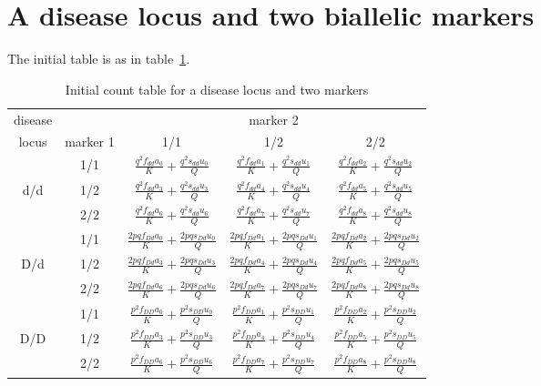 \section*{A disease locus and two biallelic markers}

The initial table is as in table~\ref{initthreethree}.

\begin{table}[h]
\centering
\caption{Initial count table for a disease locus and two markers\label{initthreethree}}
\vskip 0.3cm
\begin{tabular}{ccccc}
\hline
disease&&\multicolumn{3}{c}{marker 2}\\ \cline{3-5}
locus& marker 1& 1/1 & 1/2 & 2/2 \\
\hline
   & 1/1 &$ \frac{  q^2f_{dd}a_{0}}{K} + \frac{  q^2s_{dd}u_{0}}{Q} $ &
          $ \frac{  q^2f_{dd}a_{1}}{K} + \frac{  q^2s_{dd}u_{1}}{Q} $ &
          $ \frac{  q^2f_{dd}a_{2}}{K} + \frac{  q^2s_{dd}u_{2}}{Q} $ \\
d/d& 1/2 &$ \frac{  q^2f_{dd}a_{3}}{K} + \frac{  q^2s_{dd}u_{3}}{Q} $ &
          $ \frac{  q^2f_{dd}a_{4}}{K} + \frac{  q^2s_{dd}u_{4}}{Q} $ &
          $ \frac{  q^2f_{dd}a_{5}}{K} + \frac{  q^2s_{dd}u_{5}}{Q} $ \\
   & 2/2 &$ \frac{  q^2f_{dd}a_{6}}{K} + \frac{  q^2s_{dd}u_{6}}{Q} $ &
          $ \frac{  q^2f_{dd}a_{7}}{K} + \frac{  q^2s_{dd}u_{7}}{Q} $ &
          $ \frac{  q^2f_{dd}a_{8}}{K} + \frac{  q^2s_{dd}u_{8}}{Q} $ \\
   & 1/1 &$ \frac{2 p qf_{Dd}a_{0}}{K} + \frac{2 p qs_{Dd}u_{0}}{Q} $ &
          $ \frac{2 p qf_{Dd}a_{1}}{K} + \frac{2 p qs_{Dd}u_{1}}{Q} $ &
          $ \frac{2 p qf_{Dd}a_{2}}{K} + \frac{2 p qs_{Dd}u_{2}}{Q} $ \\
D/d& 1/2 &$ \frac{2 p qf_{Dd}a_{3}}{K} + \frac{2 p qs_{Dd}u_{3}}{Q} $ &
          $ \frac{2 p qf_{Dd}a_{4}}{K} + \frac{2 p qs_{Dd}u_{4}}{Q} $ &
          $ \frac{2 p qf_{Dd}a_{5}}{K} + \frac{2 p qs_{Dd}u_{5}}{Q} $ \\
   & 2/2 &$ \frac{2 p qf_{Dd}a_{6}}{K} + \frac{2 p qs_{Dd}u_{6}}{Q} $ &
          $ \frac{2 p qf_{Dd}a_{7}}{K} + \frac{2 p qs_{Dd}u_{7}}{Q} $ &
          $ \frac{2 p qf_{Dd}a_{8}}{K} + \frac{2 p qs_{Dd}u_{8}}{Q} $ \\
   & 1/1 &$ \frac{  p^2f_{DD}a_{0}}{K} + \frac{  p^2s_{DD}u_{0}}{Q} $ &
          $ \frac{  p^2f_{DD}a_{1}}{K} + \frac{  p^2s_{DD}u_{1}}{Q} $ &
          $ \frac{  p^2f_{DD}a_{2}}{K} + \frac{  p^2s_{DD}u_{2}}{Q} $ \\
D/D& 1/2 &$ \frac{  p^2f_{DD}a_{3}}{K} + \frac{  p^2s_{DD}u_{3}}{Q} $ &
          $ \frac{  p^2f_{DD}a_{4}}{K} + \frac{  p^2s_{DD}u_{4}}{Q} $ &
          $ \frac{  p^2f_{DD}a_{5}}{K} + \frac{  p^2s_{DD}u_{5}}{Q} $ \\
   & 2/2 &$ \frac{  p^2f_{DD}a_{6}}{K} + \frac{  p^2s_{DD}u_{6}}{Q} $ &
          $ \frac{  p^2f_{DD}a_{7}}{K} + \frac{  p^2s_{DD}u_{7}}{Q} $ &
          $ \frac{  p^2f_{DD}a_{8}}{K} + \frac{  p^2s_{DD}u_{8}}{Q} $ \\
\hline
\end{tabular}
\end{table}

